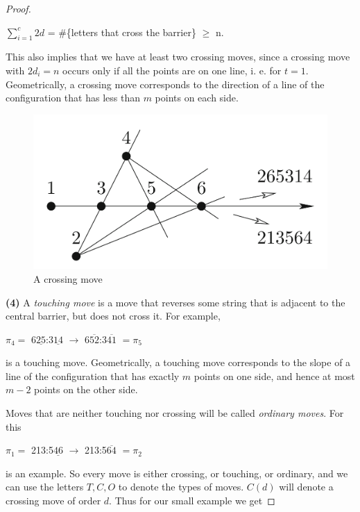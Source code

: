 \documentclass[a4paper]{article}
\begin{document}
\begin{proof}
\begin{center}
$\sum_{i=1}^{c} 2d$  = \#\{letters that cross the barrier\} $\geq$ n.
\end{center}

\noindent
This also implies that we have at least two crossing moves, since a crossing move with $2d_i = n$ occurs only if all the points are on one line, i. e. for $t = 1$. Geometrically, a crossing move corresponds to the direction of a line of the configuration that has less than $m$ points on each side.

\begin{figure}[H]
    \centering
    \includegraphics[scale=0.2]{pics/picture6.png}
    \caption{A crossing move}
\end{figure}

\noindent
\textbf{(4)} A \textit{touching move} is a move that reverses some string that is adjacent to the central barrier, but does not cross it. For example,

\begin{center}
$\pi_4 =$ 6\(\underline{25}\):3\(\underline{14}\) $\longrightarrow$ 6\(\overline{52}\):3\(\overline{41}\) $= \pi_5$
\end{center}

\noindent
is a touching move. Geometrically, a touching move corresponds to the slope of a line of the configuration that has exactly $m$ points on one side, and hence at most $m - 2$ points on the other side.

\noindent
Moves that are neither touching nor crossing will be called \textit{ordinary moves}. For this

\begin{center}
$\pi_1 =$ 213:5\(\underline{46}\) $\longrightarrow$ 213:5\(\overline{64}\) $= \pi_2$
\end{center}

\noindent
is an example. So every move is either crossing, or touching, or ordinary, and we can use the letters $T, C, O$ to denote the types of moves. $C(d)$ will denote a crossing move of order $d$. Thus for our small example we get


\end{proof}
\end{document}
